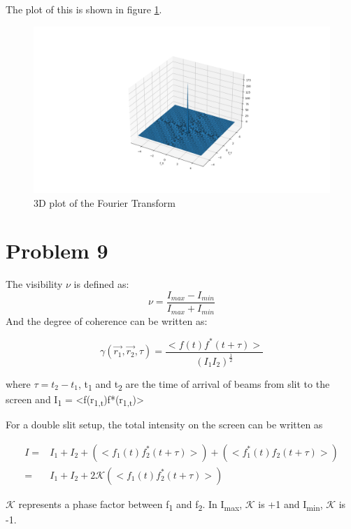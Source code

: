 \documentclass[a4paper,11pt]{article}
\begin{document}
The plot of this is shown in figure \ref{fig:org0e78d47}.
\begin{figure}[t]
\centering
\includegraphics[width=17cm]{3D_plot_pr8.png}
\caption{\label{fig:org0e78d47}3D plot of the Fourier Transform}
\end{figure}
\newpage
\section*{Problem 9}
\label{sec:org84cbfb8}

The visibility \(\nu\) is defined as:
\begin{equation}
\label{eq:orgaeb9f7c}
\nu = \frac{I_{max}-I_{min}}{I_{max}+I_{min}}
\end{equation}
And the degree of coherence can be written as:

\begin{equation}
\label{eq:org921240d}
\gamma(\vec{r_1},\vec{r_2},\tau) = \frac{<f(t)f^*(t+\tau)>}{(I_1I_2)^{\frac{1}{2}}}
\end{equation}

where \(\tau=t_2-t_1\), t\textsubscript{1} and t\textsubscript{2} are the time of arrival of beams from slit to the screen and I\textsubscript{1} = <f(r\textsubscript{1,t})f*(r\textsubscript{1,t})>

For a double slit setup, the total intensity on the screen can be written as

\begin{equation}
\begin{split}
I = & I_1+I_2+(<f_1(t)f_2^*(t+\tau)>)+(<f_1^*(t)f_2(t+\tau)>) \\
= & I_1+I_2+2\mathcal{K}(<f_1(t)f_2^*(t+\tau)>)
\end{split}
\end{equation}

\(\mathcal{K}\) represents a phase factor between f\textsubscript{1} and f\textsubscript{2}. In I\textsubscript{max}, \(\mathcal{K}\) is +1 and I\textsubscript{min}, \(\mathcal{K}\) is -1.
\end{document}
